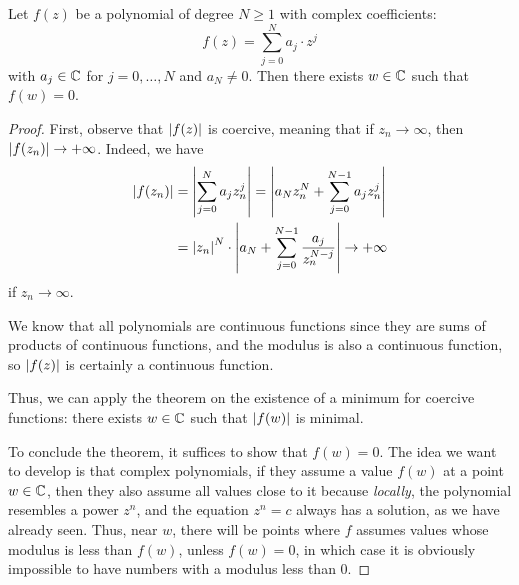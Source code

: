 \begin{theorem}
\label{th:fondamentale_algebra}
%
%
Let $f(z)$ be a polynomial of degree $N\ge 1$ with complex coefficients:
\[
  f(z) = \sum_{j=0}^N a_j \cdot z^j
\]
with $a_j\in {\mathbb C}$ for $j=0,\dots,N$ and $a_N \neq 0$.
Then there exists $w\in {\mathbb C}$ such that $f(w) = 0$.
\end{theorem}
%
\begin{proof}
    First, observe that ${\left|f(z)\right|}$ is coercive, meaning that if $z_n \to
  \infty$, then ${\left|f(z_n)\right|}\to +\infty$.
  Indeed, we have
  \begin{align*}
    {\left|f(z_n)\right|}
    &= {\left|\sum_{j=0}^N a_j z_n^j\right|}
    = {\left|a_N z_n^N  + \sum_{j=0}^{N-1} a_j z_n^j\right|}\\
    &= {\left|z_n\right|}^N \cdot {\left|a_N + \sum_{j=0}^{N-1} \frac{a_j}{z_n^{N-j}}\right|}
    \to +\infty
  \end{align*}
  if $z_n \to \infty$.
  
    We know that all polynomials are continuous functions since they are sums of
  products of continuous functions, and the modulus is also a continuous
  function, so ${\left|f(z)\right|}$ is certainly a continuous function.
  
    Thus, we can apply the theorem on the existence of a minimum for coercive
  functions: there exists $w\in {\mathbb C}$ such that ${\left|f(w)\right|}$ is minimal.
  
  To conclude the theorem, it suffices to show that $f(w)=0$.
    The idea we want to develop is that complex polynomials, if they assume a
  value $f(w)$ at a point $w\in {\mathbb C}$, then they also assume all values close to
  it because \emph{locally}, the polynomial resembles a power $z^n$, and the
  equation $z^n=c$ always has a solution, as we have already seen.
    Thus, near $w$, there will be points where $f$ assumes values whose modulus
  is less than $f(w)$, unless $f(w)=0$, in which case it is obviously impossible
  to have numbers with a modulus less than $0$.
  

\end{proof}
